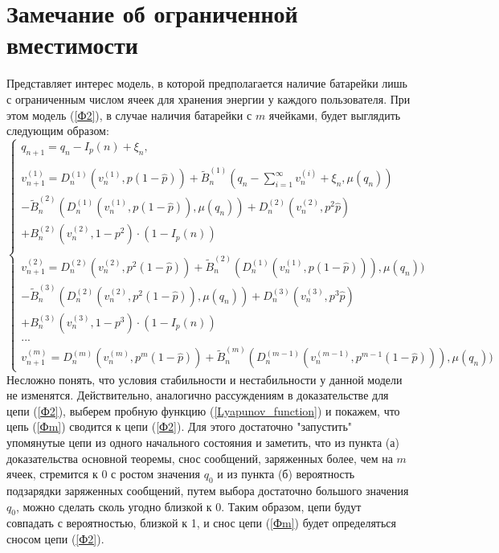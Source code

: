 \documentclass[10pt, reqno]{amsart}
\begin{document}
\section{Замечание об ограниченной вместимости}
Представляет интерес модель, в которой предполагается наличие батарейки лишь с ограниченным числом ячеек для хранения энергии у каждого пользователя. При этом модель (\ref{Ф2}), в случае наличия батарейки с $m$ ячейками, будет выглядить следующим образом:
\small
\begin{equation*}
\begin{cases}
q_{n+1} = q_{n} − I_{p}(n) + \xi_{n}, \\\\
v_{n+1}^{(1)} = D_{n}^{(1)}(v_{n}^{(1)}, p(1-\hat{p})) + \widetilde{B}_{n}^{(1)}(q_{n} − \sum_{i=1}^{\infty}v_{n}^{(i)} + \xi_{n}, \mu(q_{n})) \\- \widetilde{B}_{n}^{(2)}(D_{n}^{(1)}(v_{n}^{(1)}, p(1-\hat{p})), \mu(q_{n})) + D_{n}^{(2)}(v_{n}^{(2)}, p^{2}\hat{p}) \\+ B_{n}^{(2)}(v_{n}^{(2)}, 1-p^{2})\cdot(1-I_{p}(n))\\\\
v_{n+1}^{(2)} = D_{n}^{(2)}(v_{n}^{(2)}, p^{2}(1-\hat{p})) + \widetilde{B}_{n}^{(2)}(D_{n}^{(1)}(v_{n}^{(1)}, p(1-\hat{p}))), \mu(q_{n})) \\- \widetilde{B}_{n}^{(3)}(D_{n}^{(2)}(v_{n}^{(2)}, p^{2}(1-\hat{p})), \mu(q_{n})) + D_{n}^{(3)}(v_{n}^{(3)}, p^{3}\hat{p}) \\+ B_{n}^{(3)}(v_{n}^{(3)}, 1-p^{3})\cdot(1-I_{p}(n))\\
...\\
v_{n+1}^{(m)} = D_{n}^{(m)}(v_{n}^{(m)}, p^{m}(1-\hat{p})) + \widetilde{B}_{n}^{(m)}(D_{n}^{(m-1)}(v_{n}^{(m-1)}, p^{m-1}(1-\hat{p}))), \mu(q_{n}))
\end{cases}
\tag{Mm}
\label{Фm}
\end{equation*}
\normalsize
Несложно понять, что условия стабильности и нестабильности у данной модели не изменятся. Действительно, аналогично рассуждениям в доказательстве для цепи (\ref{Ф2}), выберем пробную функцию (\ref{Lyapunov_function}) и покажем, что цепь (\ref{Фm}) сводится к цепи (\ref{Ф2}). Для этого достаточно "запустить"$ $ упомянутые цепи из одного начального состояния и заметить, что из пункта (а) доказательства основной теоремы, снос сообщений, заряженных более, чем на $m$ ячеек, стремится к 0 с ростом значения $q_{0}$ и из пункта (б) вероятность подзарядки заряженных сообщений, путем выбора достаточно большого значения $q_{0}$, можно сделать сколь угодно близкой к 0. Таким образом, цепи будут совпадать с вероятностью, близкой к 1, и снос цепи (\ref{Фm}) будет определяться сносом цепи (\ref{Ф2}).\\
\end{document}
